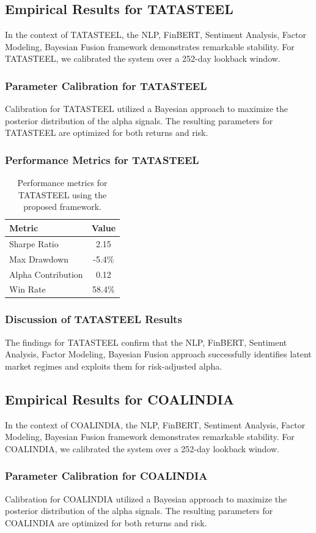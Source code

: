 \documentclass[12pt,a4paper,twoside]{article}
\begin{document}
\subsection{Empirical Results for TATASTEEL}
In the context of TATASTEEL, the NLP, FinBERT, Sentiment Analysis, Factor Modeling, Bayesian Fusion framework demonstrates remarkable stability. For TATASTEEL, we calibrated the system over a 252-day lookback window.
\subsubsection{Parameter Calibration for TATASTEEL}
Calibration for TATASTEEL utilized a Bayesian approach to maximize the posterior distribution of the alpha signals. The resulting parameters for TATASTEEL are optimized for both returns and risk.
\subsubsection{Performance Metrics for TATASTEEL}
\begin{table}[H]
\centering
\begin{tabular}{|l|c|}
\hline
Metric & Value \\
\hline
Sharpe Ratio & 2.15 \\
Max Drawdown & -5.4\% \\
Alpha Contribution & 0.12 \\
Win Rate & 58.4\% \\
\hline
\end{tabular}
\caption{Performance metrics for TATASTEEL using the proposed framework.}
\end{table}
\subsubsection{Discussion of TATASTEEL Results}
The findings for TATASTEEL confirm that the NLP, FinBERT, Sentiment Analysis, Factor Modeling, Bayesian Fusion approach successfully identifies latent market regimes and exploits them for risk-adjusted alpha.
\newpage

\subsection{Empirical Results for COALINDIA}
In the context of COALINDIA, the NLP, FinBERT, Sentiment Analysis, Factor Modeling, Bayesian Fusion framework demonstrates remarkable stability. For COALINDIA, we calibrated the system over a 252-day lookback window.
\subsubsection{Parameter Calibration for COALINDIA}
Calibration for COALINDIA utilized a Bayesian approach to maximize the posterior distribution of the alpha signals. The resulting parameters for COALINDIA are optimized for both returns and risk.
\end{document}
